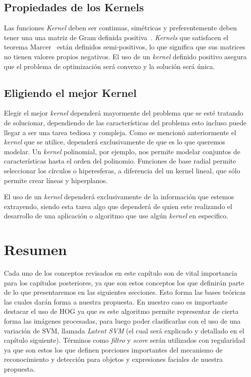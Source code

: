 \subsection{Propiedades de los Kernels}

Las funciones \textit{Kernel} deben ser continuas, simétricas y preferentemente deben tener una una matriz de Gram definida positiva~\cite{Gram}. \textit{Kernels} que satisfacen el teorema Marcer~\cite{minh2006mercer} están definidos semi-positivos, lo que significa que sus matrices no tienen valores propios negativos. El uso de un \textit{kernel} definido positivo asegura que el problema de optimización será convexo y la solución será única.

\subsection{Eligiendo el mejor Kernel}

Elegir el mejor \textit{kernel} dependerá mayormente del problema que se esté tratando de solucionar, dependiendo de las características del problema esto incluso puede llegar a ser una tarea tediosa y compleja. Como se mencionó anteriormente el \textit{kernel} que se utilice, dependerá exclusivamente de que es lo que queremos modelar. Un \textit{kernel} polinomial, por ejemplo, nos permite modelar conjuntos de características hasta el orden del polinomio. Funciones de base radial permite seleccionar los círculos o hiperesferas, a diferencia del un kernel lineal, que sólo permite crear líneas y hiperplanos. 

El uso de un \textit{kernel} dependerá exclusivamente de la información que estemos extrayendo, siendo esta tarea algo que dependerá de quien este realizando el desarrollo de una aplicación o algoritmo que use algún \textit{kernel} en especifico.

\section{Resumen}\label{sec:resumen}

Cada uno de los conceptos revisados en este capítulo son de vital importancia para los capítulos posteriores, ya que son estos conceptos los que definirán parte de lo que presentaremos en las siguientes secciones. Esto forma las bases teóricas las cuales darán forma a nuestra propuesta. En nuestro caso es importante destacar el uso de HOG ya que es este algoritmo permite representar de cierta forma las imágenes procesadas, para luego poder clasificarlas con el uso de una variación de SVM, llamada \textit{Latent SVM} (el cual será explicado y detallado en el capítulo siguiente). Términos como \textit{filtro} y \textit{score} serán utilizados con regularidad ya que son estos los que definen porciones importantes del mecanismo de reconocimiento y detección para objetos y expresiones faciales de nuestra propuesta.